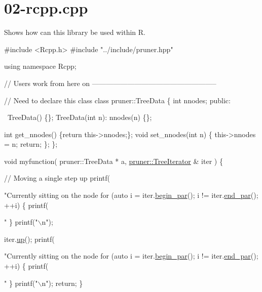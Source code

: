 \hypertarget{02-rcpp_8cpp-example}{}\section{02-\/rcpp.\+cpp}
Shows how can this library be used within R.


\begin{DoxyCodeInclude}
\textcolor{preprocessor}{#include <Rcpp.h>}
\textcolor{preprocessor}{#include "../include/pruner.hpp"}  

\textcolor{keyword}{using namespace }Rcpp; 

\textcolor{comment}{// Users work from here on -----------------------------------------------------}

\textcolor{comment}{// Need to declare this class}
\textcolor{keyword}{class }pruner::TreeData \{
  \textcolor{keywordtype}{int} nnodes;
\textcolor{keyword}{public}:
  
  ~TreeData() \{\};
  TreeData(\textcolor{keywordtype}{int} n): nnodes(n) \{\};
  
  \textcolor{keywordtype}{int} get\_nnodes() \{\textcolor{keywordflow}{return} this->nnodes;\};
  \textcolor{keywordtype}{void} set\_nnodes(\textcolor{keywordtype}{int} n) \{
    this->nnodes = n;
    \textcolor{keywordflow}{return};
  \};
\};

\textcolor{keywordtype}{void} myfunction(
    pruner::TreeData * a,
    \hyperlink{classpruner_1_1TreeIterator}{pruner::TreeIterator} & iter
  ) \{
  
  \textcolor{comment}{// Moving a single step up}
  printf(\textcolor{stringliteral}{"Currently sitting on the node %
  \textcolor{keywordflow}{for} (\textcolor{keyword}{auto} i = iter.\hyperlink{classpruner_1_1TreeIterator_ac401c51b2a8b33e7db63b850350c21ce}{begin\_par}(); i != iter.\hyperlink{classpruner_1_1TreeIterator_a89ccb546a2fc6add499ac54ecb5271f8}{end\_par}(); ++i) \{
    printf(\textcolor{stringliteral}{" %
  \}
  printf(\textcolor{stringliteral}{"\(\backslash\)n"});
  
  iter.\hyperlink{classpruner_1_1TreeIterator_adca1d999f093a69e2f5d044b358e5da7}{up}();
  printf(\textcolor{stringliteral}{"Currently sitting on the node %
  \textcolor{keywordflow}{for} (\textcolor{keyword}{auto} i = iter.\hyperlink{classpruner_1_1TreeIterator_ac401c51b2a8b33e7db63b850350c21ce}{begin\_par}(); i != iter.\hyperlink{classpruner_1_1TreeIterator_a89ccb546a2fc6add499ac54ecb5271f8}{end\_par}(); ++i) \{
    printf(\textcolor{stringliteral}{" %
  \}
  printf(\textcolor{stringliteral}{"\(\backslash\)n"});
  \textcolor{keywordflow}{return};
\}

}}}}
\end{DoxyCodeInclude}
